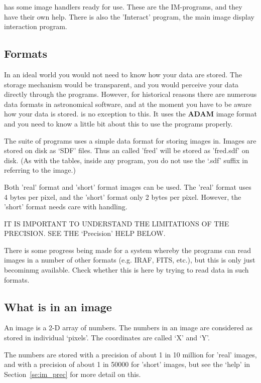 \starman has some image handlers ready for use. These are the
IM-programs, and they have their own help. There is also the 'Interact'
program, the main image display interaction program.

\subsection{Formats}

In an ideal world you would not need to know how your data are stored.
The storage mechanism would be transparent, and you would perceive your
data directly through the programs.  However, for historical reasons
there are numerous data formats in astronomical software, and at the
moment you have to be aware how your data is stored. \starman is no
exception to this.  It uses the {\bf ADAM} image format and you need to
know a little bit about this to use the programs properly.


The \starman suite of programs uses a simple data format for storing
images in. Images are stored on disk as `SDF' files. Thus an called
'fred' will be stored as 'fred.sdf' on disk. (As with the tables,
inside any \starman program, you do not use the `.sdf' suffix in
referring to the image.)

Both 'real' format and 'short' format images can be used. The 'real'
format uses 4 bytes per pixel, and the 'short' format only 2 bytes per
pixel. However, the 'short' format needs care with handling.

IT IS IMPORTANT TO UNDERSTAND THE LIMITATIONS OF THE PRECISION. SEE THE
`Precision' HELP BELOW.

There is some progress being made for a system whereby the programs can
read images in a number of other formats (e.g. IRAF, FITS, etc.), but
this is only just becominmg available. Check whether this is here by
trying to read data in such formats.


\subsection{What is in an image}

An image is a 2-D array of numbers. The numbers in an image are
considered as stored in individual `pixels'. The coordinates are called
`X' and `Y'.

The numbers are stored with a precision of about 1 in 10 million for
'real' images, and with a precision of about 1 in 50000 for 'short'
images, but see the `help' in Section~\ref{se:im_prec} for more detail
on this.

